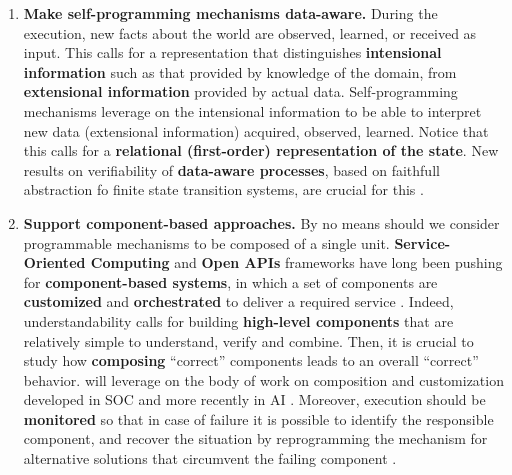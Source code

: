 \begin{enumerate}
\item \textbf{Make self-programming mechanisms data-aware.}
  During the execution, new facts about the world are observed,
  learned, or received as input. This calls for a representation that
  distinguishes \textbf{intensional information} such as that provided
  by knowledge of the domain, from \textbf{extensional information}
  provided by actual data. Self-programming mechanisms leverage on the
  intensional information to be able to interpret new data
  (extensional information) acquired, observed, learned.  Notice that
  this calls for a \textbf{relational (first-order) representation of
    the state}.  New results on verifiability of \textbf{data-aware
    processes}, based on faithfull abstraction fo finite state
  transition systems, are
  crucial for this \cite{ClassenL08,HaririCGDM13,ClassenLLZ14,HullSV13,BelardinelliLP14,DeGLP16,CDMP17}.


\item \textbf{Support component-based approaches.}  
  By no means should we consider programmable mechanisms to be
  composed of a single unit. \textbf{Service-Oriented Computing} and
  \textbf{Open APIs} frameworks have long been pushing for
  \textbf{component-based systems}, in which a set of components are
  \textbf{customized} and \textbf{orchestrated} to deliver a required
  service \cite{wsf2014}.  Indeed, understandability calls for
  building \textbf{high-level components} that are relatively simple
  to understand, verify and combine. Then, it is crucial to study how
  \textbf{composing} ``correct'' components leads to an overall
  ``correct'' behavior.
\project will leverage on the body of work on composition and customization developed in SOC and more recently in AI
 \cite{SohrabiPM09,BertoliPT10,DePS13,DeGGPSS16}.%
Moreover, execution should be \textbf{monitored} so that in case of
failure it is possible to identify the responsible component, and
recover the situation by reprogramming the mechanism for alternative
solutions that circumvent the failing
component \cite{DeGMGMM14,MarrellaMS17}.



\end{enumerate}
